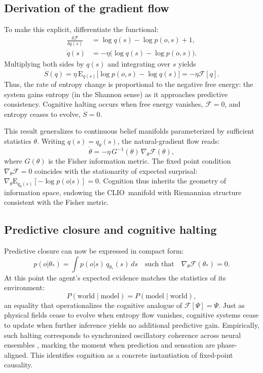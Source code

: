 \documentclass[12pt,a4paper]{article}
\newcommand{\CLIO}{CLIO}              %
\newcommand{\State}{\Psi}             %
\newcommand{\F}{\mathcal{F}}          %
\theoremstyle{plain}
\begin{document}
\subsection{Derivation of the gradient flow}
To make this explicit, differentiate the functional:
\begin{align}
\frac{\delta \mathcal{F}}{\delta q(s)} 
 &= \log q(s) - \log p(o,s) + 1,\\
\dot{q}(s) 
 &= -\eta \big(\log q(s) - \log p(o,s)\big).
\end{align}
Multiplying both sides by \(q(s)\) and integrating over \(s\) yields
\begin{equation}
\dot{S}(q) = 
 \eta\, \mathrm{E}_{q(s)}\big[\log p(o,s) - \log q(s)\big]
 = -\eta \mathcal{F}[q].
\end{equation}
Thus, the rate of entropy change is proportional to the negative free energy: 
the system gains entropy (in the Shannon sense) as it approaches predictive consistency.  
Cognitive halting occurs when free energy vanishes, \(\mathcal{F}=0\), and entropy ceases to evolve, \(\dot{S}=0\).  

This result generalizes to continuous belief manifolds parameterized by sufficient statistics \(\theta\).  
Writing \(q(s)=q_\theta(s)\),
the natural-gradient flow \citep{friston2023active} reads:
\begin{equation}
\dot{\theta} = -\eta\, G^{-1}(\theta)\,\nabla_\theta \mathcal{F}(\theta),
\end{equation}
where \(G(\theta)\) is the Fisher information metric.
The fixed point condition \(\nabla_\theta \mathcal{F}=0\)
coincides with the stationarity of expected surprisal:
\(\nabla_\theta \mathrm{E}_{q_\theta(s)}[-\log p(o|s)] = 0.\)
Cognition thus inherits the geometry of information space, endowing the \CLIO\ manifold with Riemannian structure consistent with the Fisher metric.

\subsection{Predictive closure and cognitive halting}
Predictive closure can now be expressed in compact form:
\begin{equation}
p(o|\theta_*) = \int p(o|s)\,q_{\theta_*}(s)\,ds
 \quad\text{such that}\quad
\nabla_\theta \mathcal{F}(\theta_*) = 0.
\end{equation}
At this point the agent’s expected evidence matches the statistics of its environment:
\[
P(\text{world}\mid \text{model}) = P(\text{model}\mid \text{world}),
\]
an equality that operationalizes the cognitive analogue of \(\F[\State]=\State\).
Just as physical fields cease to evolve when entropy flow vanishes,
cognitive systems cease to update when further inference yields no additional predictive gain.
Empirically, such halting corresponds to synchronized oscillatory coherence across neural ensembles \citep{kanai2024entropy}, marking the moment when prediction and sensation are phase-aligned.
This identifies cognition as a concrete instantiation of fixed-point causality.
\end{document}
